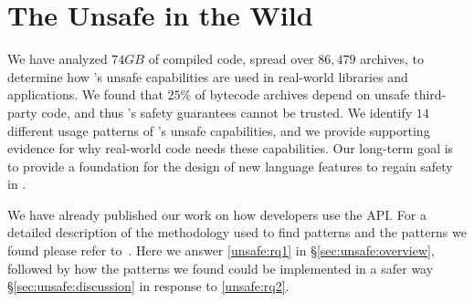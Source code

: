 




\newcommand{\artstyle}[1]{\textsl{#1}}
\newcommand{\artexp}[2]{\artstyle{#1}:\artstyle{#2}}
\newcommand{\art}[3]{\artstyle{#1}:\artstyle{#2}\footnote{\url{#3}}}

\newcommand{\member}[1]{\emph{#1}}
\newcommand{\smugroup}[1]{\textsl{#1}}
\newcommand{\stackoverflow}{Stack Overflow}



\chapter{The \java{} Unsafe \api{} in the Wild}
\label{cha:unsafe}

We have analyzed $74 GB$ of compiled \java{} code,
spread over $86,479$ \java{} archives,
to determine how \java{}'s unsafe capabilities are used in real-world libraries and applications.
We found that $25\%$ of \java{} bytecode archives depend on unsafe third-party \java{} code,
and thus \java{}'s safety guarantees cannot be trusted.
We identify $14$ different usage patterns of \java{}'s unsafe capabilities,
and we provide supporting evidence for why real-world code needs these capabilities.
Our long-term goal is to provide a foundation for the design of new language features to regain safety in \java{}.

We have already published our work on how developers use the  API.
For a detailed description of the methodology used to find patterns and the patterns we found please refer to~\cite{mastrangeloUseYourOwn2015}.
Here we answer \ref{unsafe:rq1}
in \S\ref{sec:unsafe:overview},
followed by how the patterns we found could be implemented in a safer way \S\ref{sec:unsafe:discussion}
in response to \ref{unsafe:rq2}.

